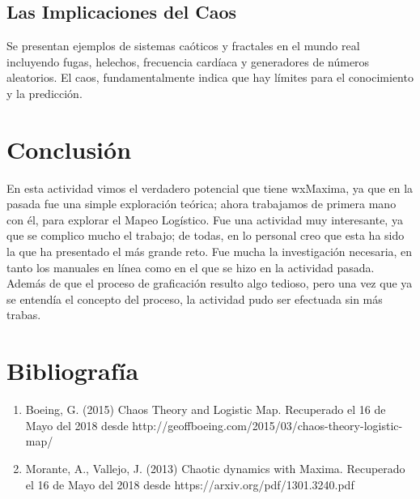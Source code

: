 \documentclass[a4paper]{article}
\begin{document}
\subsection{Las Implicaciones del Caos}
Se presentan ejemplos de sistemas caóticos y fractales en el mundo real incluyendo 
fugas, helechos, frecuencia cardíaca y generadores de números aleatorios. El caos, fundamentalmente indica que hay límites para el conocimiento y la predicción. 

\section{Conclusión}
En esta actividad vimos el verdadero potencial que tiene wxMaxima, ya que en la pasada fue una simple exploración teórica; ahora trabajamos de primera mano con él, para explorar el Mapeo Logístico. Fue una actividad muy interesante, ya que se complico mucho el trabajo; de todas, en lo personal creo que esta ha sido la que ha presentado el más grande reto. Fue mucha la investigación necesaria, en tanto los manuales en línea como en el que se hizo en la actividad pasada. Además de que el proceso de graficación resulto algo tedioso, pero una vez que ya se entendía el concepto del proceso, la actividad pudo ser efectuada sin más trabas. 



\section{Bibliografía}
\begin{enumerate}
\item Boeing, G. (2015) Chaos Theory and Logistic Map. Recuperado el 16 de Mayo del 2018 desde http://geoffboeing.com/2015/03/chaos-theory-logistic-map/
\item Morante, A., Vallejo, J. (2013) Chaotic dynamics with Maxima. Recuperado el 16 de Mayo del 2018 desde https://arxiv.org/pdf/1301.3240.pdf
\end{enumerate}

                         
\end{document}
